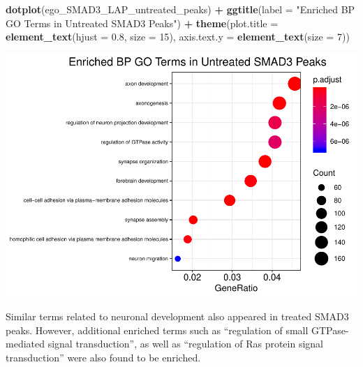 \documentclass[]{article}
\newenvironment{Shaded}{\begin{snugshade}}{\end{snugshade}}
\newcommand{\DataTypeTok}[1]{\textcolor[rgb]{0.13,0.29,0.53}{#1}}
\newcommand{\DecValTok}[1]{\textcolor[rgb]{0.00,0.00,0.81}{#1}}
\newcommand{\FloatTok}[1]{\textcolor[rgb]{0.00,0.00,0.81}{#1}}
\newcommand{\KeywordTok}[1]{\textcolor[rgb]{0.13,0.29,0.53}{\textbf{#1}}}
\newcommand{\NormalTok}[1]{#1}
\newcommand{\OperatorTok}[1]{\textcolor[rgb]{0.81,0.36,0.00}{\textbf{#1}}}
\newcommand{\StringTok}[1]{\textcolor[rgb]{0.31,0.60,0.02}{#1}}
\begin{document}
\clearpage{}

\begin{Shaded}
\begin{Highlighting}[]
\KeywordTok{dotplot}\NormalTok{(ego_SMAD3_LAP_untreated_peaks) }\OperatorTok{+}\StringTok{ }\KeywordTok{ggtitle}\NormalTok{(}\DataTypeTok{label =} \StringTok{"Enriched BP GO Terms in Untreated SMAD3 Peaks"}\NormalTok{) }\OperatorTok{+}\StringTok{ }\KeywordTok{theme}\NormalTok{(}\DataTypeTok{plot.title =} \KeywordTok{element_text}\NormalTok{(}\DataTypeTok{hjust =} \FloatTok{0.8}\NormalTok{, }\DataTypeTok{size =} \DecValTok{15}\NormalTok{), }\DataTypeTok{axis.text.y =} \KeywordTok{element_text}\NormalTok{(}\DataTypeTok{size =} \DecValTok{7}\NormalTok{))}
\end{Highlighting}
\end{Shaded}

\includegraphics{peak_annotation_go_term_analysis_files/figure-latex/unnamed-chunk-17-1.pdf}

\clearpage{}

Similar terms related to neuronal development also appeared in treated
SMAD3 peaks. However, additional enriched terms such as ``regulation of
small GTPase-mediated signal transduction'', as well as ``regulation of
Ras protein signal transduction'' were also found to be enriched.
\end{document}

